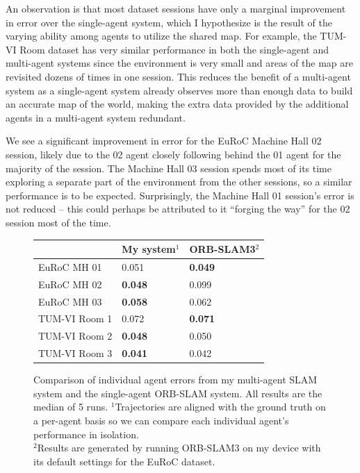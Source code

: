 An observation is that most dataset sessions have only a marginal improvement in error over the single-agent system, which I hypothesize is the result of the varying ability among agents to utilize the shared map. For example, the TUM-VI Room dataset has very similar performance in both the single-agent and multi-agent systems since the environment is very small and areas of the map are revisited dozens of times in one session. This reduces the benefit of a multi-agent system as a single-agent system already observes more than enough data to build an accurate map of the world, making the extra data provided by the additional agents in a multi-agent system redundant.

We see a significant improvement in error for the EuRoC Machine Hall 02 session, likely due to the 02 agent closely following behind the 01 agent for the majority of the session. The Machine Hall 03 session spends most of its time exploring a separate part of the environment from the other sessions, so a similar performance is to be expected. Surprisingly, the Machine Hall 01 session's error is not reduced – this could perhaps be attributed to it ``forging the way'' for the 02 session most of the time. 

\begin{figure}[h]
    \centering
    \def\arraystretch{1.2}
    \begin{tabular}{ |l|l|l| }
        \cline{2-3}
        \multicolumn{1}{c|}{} & My system$^1$  & ORB-SLAM3$^2$  \\
        \hline
        EuRoC MH 01           & 0.051          & \textbf{0.049} \\
        EuRoC MH 02           & \textbf{0.048} & 0.099          \\
        EuRoC MH 03           & \textbf{0.058} & 0.062          \\
        \hline
        TUM-VI Room 1         & 0.072          & \textbf{0.071} \\
        TUM-VI Room 2         & \textbf{0.048} & 0.050          \\
        TUM-VI Room 3         & \textbf{0.041} & 0.042          \\
        \hline
    \end{tabular}

    \caption{Comparison of individual agent errors from my multi-agent SLAM system and the single-agent ORB-SLAM system. All results are the median of 5 runs. \captionbreak $^1$Trajectories are aligned with the ground truth on a per-agent basis so we can compare each individual agent's performance in isolation. \\ $^2$Results are generated by running ORB-SLAM3 on my device with its default settings for the EuRoC dataset.}
    \label{fig:comparison-to-single-agent-systems}
\end{figure}

